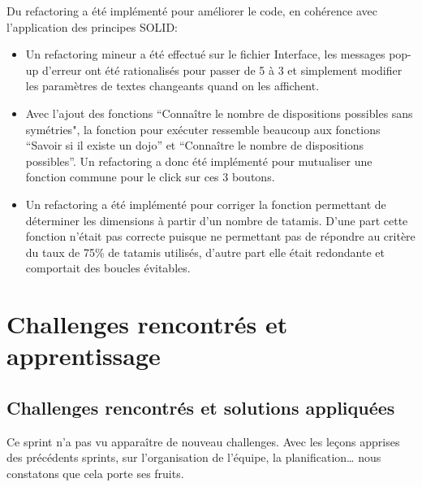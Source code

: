Du refactoring a été implémenté pour améliorer le code, en cohérence avec l’application des principes SOLID:
\begin{itemize}
    \item Un refactoring mineur a été effectué sur le fichier Interface, les messages pop-up d’erreur ont été rationalisés pour passer
          de 5 à 3 et simplement modifier les paramètres de textes changeants quand on les affichent.
    \item Avec l’ajout des fonctions “Connaître le nombre de dispositions possibles sans symétries", la fonction pour exécuter ressemble
          beaucoup aux fonctions “Savoir si il existe un dojo” et “Connaître le nombre de dispositions possibles”. Un refactoring a donc été
          implémenté pour mutualiser une fonction commune pour le click sur ces 3 boutons.
    \item Un refactoring a été implémenté pour corriger la fonction permettant de déterminer les dimensions à partir d'un nombre de tatamis. D'une part
          cette fonction n'était pas correcte puisque ne permettant pas de répondre au critère du taux de 75\% de tatamis utilisés, d'autre part elle était redondante
          et comportait des boucles évitables.

\end{itemize}

\section{Challenges rencontrés et apprentissage}

\subsection{Challenges rencontrés et solutions appliquées}

Ce sprint n’a pas vu apparaître de nouveau challenges. Avec les leçons apprises des précédents sprints, sur l’organisation de l'équipe,
la planification… nous constatons que cela porte ses fruits.

